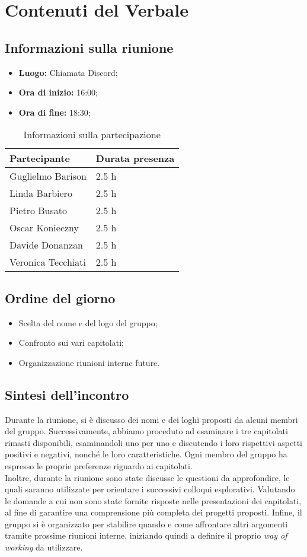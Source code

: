 \section{Contenuti del Verbale}
\subsection{Informazioni sulla riunione}
\begin{itemize}
	\setlength\itemsep{0em}
	\item\textbf{Luogo:} Chiamata Discord;
	\item\textbf{Ora di inizio:} 16:00;
	\item\textbf{Ora di fine:}  18:30;
\end{itemize}
\begin{table}[ht!]
	\begin{tabular}{p{3cm} p{3cm}}
		\toprule
		\textbf{Partecipante} & \textbf{Durata presenza} \\
		\midrule
		Guglielmo Barison & 2.5 h \\
		Linda Barbiero &  2.5 h \\
		Pietro Busato & 2.5 h \\
		Oscar Konieczny & 2.5 h \\
		Davide Donanzan & 2.5 h \\
		Veronica Tecchiati & 2.5 h \\
		\bottomrule
	\end{tabular}
	\caption{Informazioni sulla partecipazione}
	\label{table:Informazioni sulla partecipazione}
\end{table}
\subsection{Ordine del giorno}
\begin{itemize}
	\setlength\itemsep{0em}
	\item Scelta del nome e del logo del gruppo;	
	\item Confronto sui vari capitolati;
	\item Organizzazione riunioni interne future.
\end{itemize}
\subsection{Sintesi dell'incontro}
Durante la riunione, si è discusso dei nomi e dei loghi proposti da alcuni membri del gruppo. 
Successivamente, abbiamo proceduto ad esaminare i tre capitolati rimasti disponibili, esaminandoli uno per uno e discutendo i loro rispettivi aspetti positivi e negativi, nonché le loro caratteristiche. Ogni membro del gruppo ha espresso le proprie preferenze riguardo ai capitolati. \\
Inoltre, durante la riunione sono state discusse le questioni da approfondire, le quali saranno utilizzate per orientare i successivi colloqui esplorativi. Valutando le domande a cui non sono state fornite risposte nelle presentazioni dei capitolati, al fine di garantire una comprensione più completa dei progetti proposti.
Infine, il gruppo si è organizzato per stabilire quando e come affrontare altri argomenti tramite prossime riunioni interne, iniziando quindi a definire il proprio \textit{way of working} da utilizzare.
